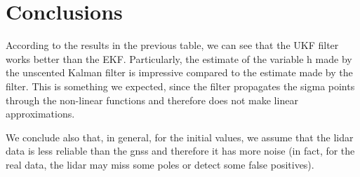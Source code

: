 \documentclass[conference]{IEEEtran}
\begin{document}
\section{Conclusions}

According to the results in the previous table, we can see that the UKF filter works better than the EKF. Particularly, the estimate of the variable h made by the unscented Kalman filter is impressive compared to the estimate made by the filter. This is something we expected, since the filter propagates the sigma points through the non-linear functions and therefore does not make linear approximations.

We conclude also that, in general, for the initial values, we assume that the lidar data is less reliable than the gnss and therefore it has more noise (in fact, for the real data, the lidar may miss some poles or detect some false positives).
\end{document}

